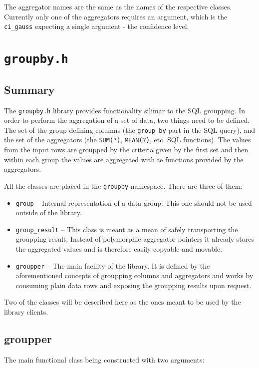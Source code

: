 \documentclass{report}
\begin{document}
	The aggregator names are the same as the names of the respective classes. Currently
	only one of the aggregators requires an argument, which is the \texttt{ci\_gauss}
	expecting a single argument - the confidence level.

\section{\texttt{groupby.h}}

	\subsection{Summary}
	The \texttt{groupby.h} library provides functionality silimar to the SQL
	groupping. In order to perform the aggregation of a set of data, two
	things need to be defined. The set of the group defining columns
	(the \texttt{group by} part in the SQL query), and the set of the aggregators
	(the \texttt{SUM(?)}, \texttt{MEAN(?)}, etc. SQL functions). The values from
	the input rows are groupped by the criteria given by the first set and then
	within each group the values are aggregated with te functions provided by
	the aggregators.

	All the classes are placed in the \texttt{groupby} namespace. There are three
	of them:

	\begin{itemize}
		\item \texttt{group} -- Internal representation of a data group.
			This one should not be used outside of the library.
		\item \texttt{group\_result} -- This class is meant as a mean of
			safely transporting the groupping result. Instead of
			polymorphic aggregator pointers it already stores the
			aggregated values and is therefore easily copyable and
			movable.
		\item \texttt{groupper} -- The main facility of the library. It
			is defined by the aforementioned concepts of groupping
			columns and aggregators and works by consuming plain data
			rows and exposing the groupping results upon request.
	\end{itemize}

	Two of the classes will be described here as the ones meant to be used by
	the library clients.

	\subsection{groupper}
	The main functional class being constructed with two arguments:
\end{document}
